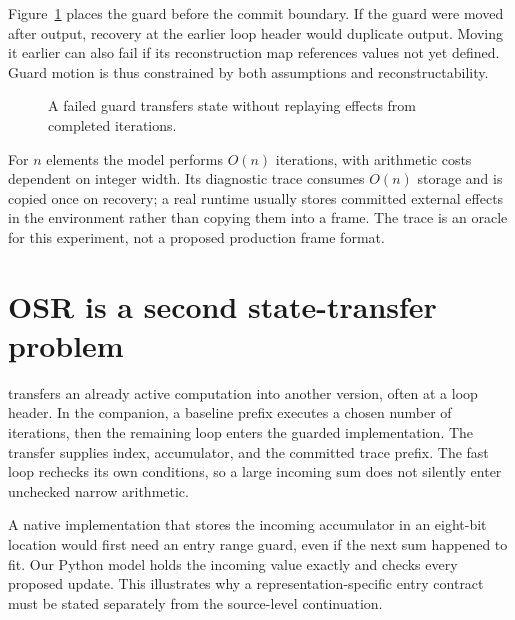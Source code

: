 Figure~\ref{fig:ch66-boundary} places the guard before the commit boundary.
If the guard were moved after output, recovery at the earlier loop header would duplicate output.
Moving it earlier can also fail if its reconstruction map references values not yet defined.
Guard motion is thus constrained by both assumptions and reconstructability.

\begin{figure}[htbp]
\centering
{}
\caption{A failed guard transfers state without replaying effects from completed iterations.}
\label{fig:ch66-boundary}
\end{figure}

For $n$ elements the model performs $O(n)$ iterations, with arithmetic costs dependent on integer width.
Its diagnostic trace consumes $O(n)$ storage and is copied once on recovery; a real runtime usually stores committed external effects in the environment rather than copying them into a frame.
The trace is an oracle for this experiment, not a proposed production frame format.

\section{OSR is a second state-transfer problem}
\label{sec:ch66-osr}

 transfers an already active computation into another version, often at a loop header.
In the companion, a baseline prefix executes a chosen number of iterations, then the remaining loop enters the guarded implementation.
The transfer supplies index, accumulator, and the committed trace prefix.
The fast loop rechecks its own conditions, so a large incoming sum does not silently enter unchecked narrow arithmetic.

A native implementation that stores the incoming accumulator in an eight-bit location would first need an entry range guard, even if the next sum happened to fit.
Our Python model holds the incoming value exactly and checks every proposed update.
This illustrates why a representation-specific entry contract must be stated separately from the source-level continuation.

